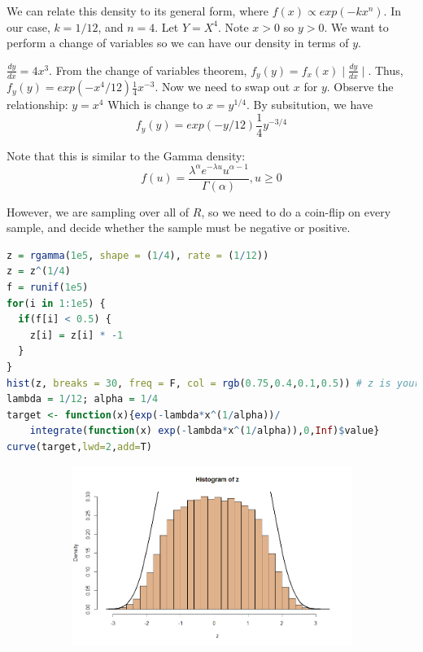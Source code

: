 \documentclass[20pt]{article} %
\begin{document}
We can relate this density to its general form, where $f(x) \propto exp(-kx^{n})$. In our case, $k=1/12$, and $n=4$.  Let $Y = X^{4}$. Note $x>0$ so $y>0$. We want to perform a change of variables so we can have our density in terms of $y$.  

$ \frac{dy}{dx} = 4x^{3}$. From the change of variables theorem, $f_y(y) = f_x(x) \mid \frac{dy}{dx} \mid$. Thus, $f_y(y) = exp(-x^{4}/12)\frac{1}{4}x^{-3}$.  Now we need to swap out $x$ for $y$.  Observe the relationship: $y=x^{4}$ Which is change to $x=y^{1/4}$. By subsitution, we have $$f_y(y)=exp(-y/12)\frac{1}{4}y^{-3/4}$$

Note that this is similar to the Gamma density: $$f(u) = \frac{\lambda^{\alpha}e^{-\lambda u}u^{\alpha - 1}}{\Gamma(\alpha)}, u \geq 0$$

However, we are sampling over all of $\!R$, so we need to do a coin-flip on every sample, and decide whether the sample must be negative or positive. 

\newpage
\begin{lstlisting}[language=R]
z = rgamma(1e5, shape = (1/4), rate = (1/12))
z = z^(1/4)
f = runif(1e5)
for(i in 1:1e5) {
  if(f[i] < 0.5) {
    z[i] = z[i] * -1
  }
}
hist(z, breaks = 30, freq = F, col = rgb(0.75,0.4,0.1,0.5)) # z is your sample
lambda = 1/12; alpha = 1/4
target <- function(x){exp(-lambda*x^(1/alpha))/
    integrate(function(x) exp(-lambda*x^(1/alpha)),0,Inf)$value}
curve(target,lwd=2,add=T)
\end{lstlisting}

\begin{figure}[!htbp]
  	\centering
   	\begin{subfigure}[p]{0.8\linewidth}
    	\includegraphics[width=\linewidth]{./figures/Rplot02.png}
   	\end{subfigure}
\end{figure} 
\end{document}
